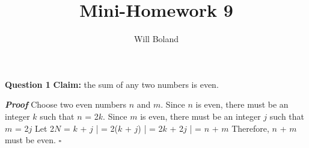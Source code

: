 \documentclass{article}
\begin{document}
\title{Mini-Homework 9}
\author{Will Boland}
\maketitle

\textbf{Question 1}\newline
\textbf{Claim: } the sum of any two numbers is even.\newline

\textbf{\textit{Proof}}\newline
Choose two even numbers $n$ and $m$.\newline
Since $n$ is even, there must be an integer $k$ such that $n$ = 2$k$.\newline
Since $m$ is even, there must be an integer $j$ such that $m$ = 2$j$\newline
Let 2$N$ = $k$ + $j$\newline
|	= 2($k$ + $j$)\newline
|	= 2$k$ + 2$j$\newline
|	= $n$ + $m$\newline
Therefore, $n$ + $m$ must be even. $\square$

\enddocument
\end{document}
